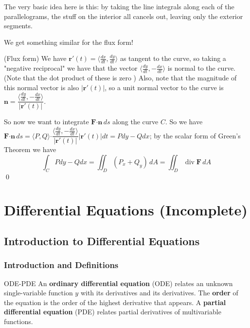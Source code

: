 \documentclass[letterpaper, 11pt, openany]{book}
\newcommand{\scdot}{\boldsymbol{\cdot}}
\newcommand{\divr}[1]{\operatorname{div}\mathbf{#1}}
\theoremstyle{mytheoremstyle}
\renewenvironment{proof}{{\par \sffamily \smaller \fontseries{b}\selectfont Proof}}{\hfill\qed}
\theoremstyle{myexamplestyle}
\begin{document}
The very basic idea here is this: by taking the line integrals along each of the parallelograms, the stuff on the interior all cancels out, leaving only the exterior segments.

We get something similar for the flux form!

\begin{proof}
    (Flux form) We have \(\mathbf{r}'(t) = \langle \frac{dx}{dt}, \frac{dy}{dt}\rangle\) as tangent to the curve, so taking a "negative reciprocal" we have that the vector \(\langle \frac{dy}{dt}, -\frac{dx}{dt}\rangle\) is normal to the curve. (Note that the dot product of these is zero \faSmile) Also, note that the magnitude of this normal vector is also \(|\mathbf{r}'(t)|\), so a unit normal vector to the curve is \(\mathbf{n} = \dfrac{\langle \frac{dy}{dt}, -\frac{dx}{dt}\rangle}{|\mathbf{r}'(t)|}\).

    So now we want to integrate \(\mathbf{F} \scdot \mathbf{n} \, ds\) along the curve \(C\). So we have \(\mathbf{F} \scdot \mathbf{n} \, ds = \langle P, Q\rangle \scdot \dfrac{\langle \frac{dy}{dt}, -\frac{dx}{dt}\rangle}{|\mathbf{r}'(t)|}  |\mathbf{r}'(t)| dt = P dy - Q dx\); by the scalar form of Green's Theorem we have
    \[\int_{C} P dy - Q dx = \iint_{D} \left(P_x + Q_y\right)\, dA = \iint_{D} \divr{F} \, dA\]
\end{proof}


\newpage
\part{Differential Equations (Incomplete)}
\thispagestyle{firstofchapter}
\chapter{Introduction to Differential Equations}
\section{Introduction and Definitions}
\setcounter{figure}{0}
\begin{definition}{}{ODE-PDE}
    An \textbf{ordinary differential equation} (ODE) relates an unknown single-variable function \(y\) with its derivatives and its derivatives. The \textbf{order} of the equation is the order of the highest derivative that appears. A \textbf{partial differential equation} (PDE) relates partial derivatives of multivariable functions.
\end{definition}
\end{document}
